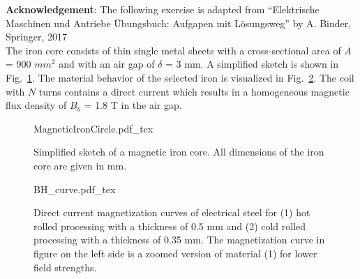 

\normalsize{\textbf{Acknowledgement}: The following exercise is adapted from ``Elektrische Maschinen und Antriebe Übungsbuch: Aufgapen mit Lösungsweg'' by A. Binder, Springer, 2017}\\




The iron core consists of thin single metal sheets with a cross-sectional area of $A$ = 900 $\si{mm}^2$ and with an air gap of $\delta$ = 3 mm. A simplified sketch is shown in Fig.~\ref{fig:MagneticIronCircle}. The material behavior of the selected iron is visualized in Fig.~\ref{fig:BH_curve}. The coil with $N$ turns contains a direct current which results in a homogeneous magnetic flux density of $B_{\mathrm{\delta}}$ = 1.8 T in the air gap.


\begin{figure}[htb]
    \centering
    {MagneticIronCircle.pdf_tex}
    \caption{Simplified sketch of a magnetic iron core. All dimensions of the iron core are given in mm.}
    \label{fig:MagneticIronCircle}
\end{figure}

\begin{figure}[htb]
    \centering
    {BH_curve.pdf_tex}
    \caption{Direct current magnetization curves of electrical steel for (1) hot rolled processing with a thickness of 0.5 mm and (2) cold rolled processing with a thickness of 0.35 mm. The magnetization curve in figure on the left side is a zoomed version of material (1) for lower field strengths.}
    \label{fig:BH_curve}
\end{figure}



